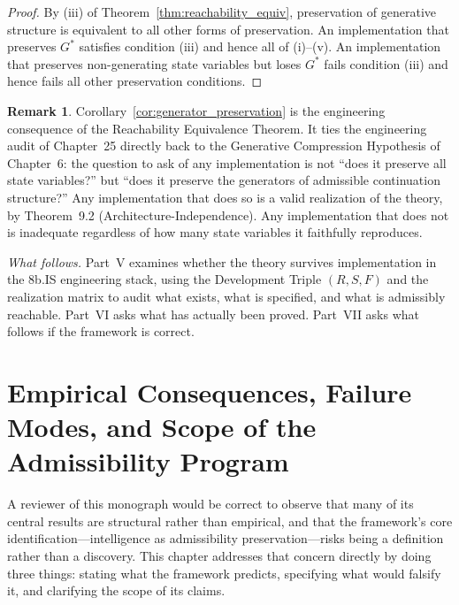 \documentclass[12pt, oneside]{book}
\theoremstyle{flyxion}
\theoremstyle{definition}
\newtheorem{remark}[theorem]{Remark}
\begin{document}
\begin{proof}
By (iii) of Theorem~\ref{thm:reachability_equiv},
preservation of generative structure is equivalent
to all other forms of preservation. An implementation
that preserves $G^*$ satisfies condition (iii) and
hence all of (i)--(v). An implementation that
preserves non-generating state variables but loses
$G^*$ fails condition (iii) and hence fails all
other preservation conditions.
\end{proof}

\begin{remark}
Corollary~\ref{cor:generator_preservation} is the
engineering consequence of the Reachability Equivalence
Theorem. It ties the engineering audit of Chapter~25
directly back to the Generative Compression Hypothesis
of Chapter~6: the question to ask of any implementation
is not ``does it preserve all state variables?'' but
``does it preserve the generators of admissible
continuation structure?'' Any implementation that
does so is a valid realization of the theory, by
Theorem~9.2 (Architecture-Independence). Any
implementation that does not is inadequate regardless
of how many state variables it faithfully reproduces.
\end{remark}

\bigskip
\noindent\emph{What follows.} Part~V examines whether
the theory survives implementation in the 8b.IS
engineering stack, using the Development Triple
$(R, S, F)$ and the realization matrix to audit
what exists, what is specified, and what is
admissibly reachable. Part~VI asks what has actually
been proved. Part~VII asks what follows if the
framework is correct.






\chapter{Empirical Consequences, Failure Modes, and
         Scope of the Admissibility Program}
\label{ch:falsification}

A reviewer of this monograph would be correct to observe that many of
its central results are structural rather than empirical, and that
the framework's core identification---intelligence as admissibility
preservation---risks being a definition rather than a discovery. This
chapter addresses that concern directly by doing three things: stating
what the framework predicts, specifying what would falsify it, and
clarifying the scope of its claims.
\end{document}

